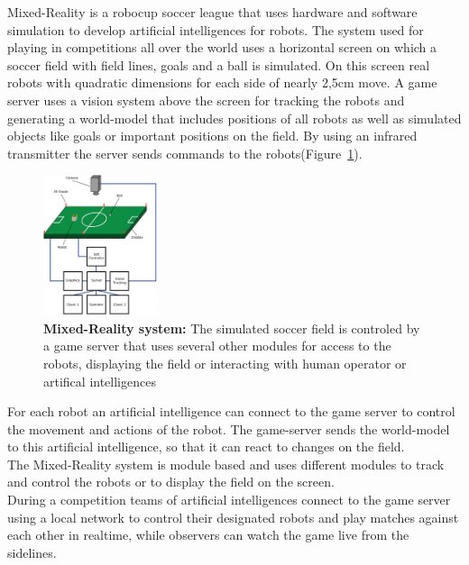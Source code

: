 \documentclass[journal]{IEEEtran}
\begin{document}
Mixed-Reality is a robocup soccer league that uses hardware and software
simulation to develop artificial intelligences for robots. The system used for
playing in competitions all over the world\cite{gerndt-case-study} uses a
horizontal screen on which a soccer field with field lines, goals and a ball is
simulated. On this screen real robots with quadratic dimensions for each side of
nearly 2,5cm move. A game server uses a vision system above the screen for
tracking the robots and generating a world-model that includes positions of all
robots as well as simulated objects like goals or important positions on the
field. By using an infrared transmitter the server sends commands to the
robots(Figure~\ref{fig:mr_system}).\\
\begin{figure}[!t]
    \centering
    \includegraphics[width=0.3\textwidth]{mr_system.png}
    \caption{\textbf{Mixed-Reality system:} The simulated soccer field is
    controled by a game server that uses several other modules for access to the
    robots, displaying the field or interacting with human operator or
    artifical intelligences}
    \label{fig:mr_system}
\end{figure}
For each robot an artificial intelligence can connect to the game server to
control the movement and actions of the robot. The game-server sends the
world-model to this artificial intelligence, so that it can react to changes on the field.\\
The Mixed-Reality system is module based and uses different modules to track and
control the robots or to display the field on the screen.\\
During a competition teams of artificial intelligences connect to the game
server using a local network to control their designated robots and play matches
against each other in realtime\cite{mr-web-northernstars}, while observers can
watch the game live from the sidelines.
\end{document}
